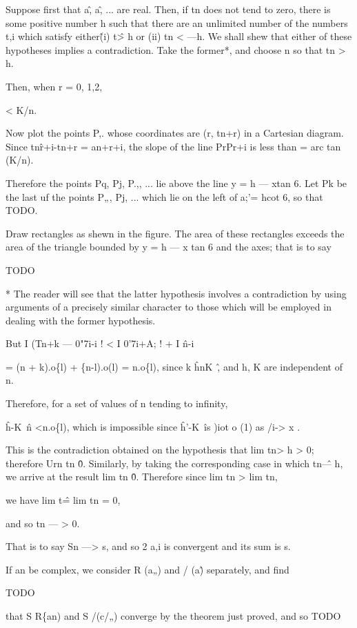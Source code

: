 Suppose first that a\^, a\^, ... are real. Then, if tn does not tend
to zero, there is some positive number h such that there are an
unlimited number of the numbers t,i which satisfy either\^ (i) t\^ > h
or (ii) tn < —h. We shall shew that either of these hypotheses implies
a contradiction. Take the former*, and choose n so that tn > h.

Then, when r = 0, 1,2,

< K/n.

Now plot the points P,. whose coordinates are (r, tn+r) in a Cartesian
diagram. Since tn\^r+i-tn+r = an+r+i, the slope of the line PrPr+i is
less than = arc tan (K/n).

Therefore the points Pq, Pj, P.,, ... lie above the line y = h — xtan
6. Let Pk be the last uf the points P„, Pj, ... which lie on the left
of a;'= hcot 6, so that TODO.

Draw rectangles as shewn in the figure. The area of these rectangles
exceeds the area of the triangle bounded by y = h — x tan 6 and the
axes; that is to say

TODO

* The reader will see that the latter hypothesis involves a
contradiction by using arguments of a precisely similar character to
those which will be employed in dealing with the former hypothesis.

%
%

But I (Tn+k — 0"7i-i ! < I 0'7i+A; ! + I \^n-i \

= (n + k).o\{l) + \{n-l).o(l) = n.o\{l), since k \^ hnK~\^, and h, K
are independent of n.

Therefore, for a set of values of n tending to infinity,

\^h-K~\^n <n.o\{l), which is impossible since \^h'-K~\^ is )iot o (1)
as /i-> x .

This is the contradiction obtained on the hypothesis that lim tn> h >
0; therefore Urn tn \^ 0. Similarly, by taking the corresponding case
in which tn\^ — h, we arrive at the result lim tn \^ 0. Therefore
since lim tn > lim tn,

we have lim t\^ = lim tn = 0,

and so tn — > 0.

That is to say Sn —> s, and so 2 a,i is convergent and its sum is s.

If an be complex, we consider R (a„) and / (a\^) separately, and find

TODO

that S R\{an) and S /(c/„) converge by the theorem just proved, and so
TODO

